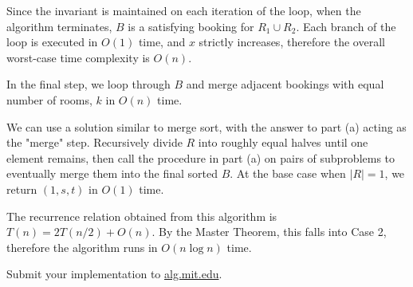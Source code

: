 \documentclass[12pt,twoside]{article}
\begin{document}
\begin{problems}
\begin{problemparts}
Since the invariant is maintained on each iteration of the loop, when the algorithm terminates, \(B\) is a satisfying booking for \(R_1 \cup R_2\). Each branch of the loop is executed in \(O(1)\) time, and \(x\) strictly increases, therefore the overall worst-case time complexity is \(O(n)\).

In the final step, we loop through \(B\) and merge adjacent bookings with equal number of rooms, \(k\) in \(O(n)\) time.

\problempart %
We can use a solution similar to merge sort, with the answer to part (a) acting as the "merge" step. Recursively divide \(R\) into roughly equal halves until one element remains, then call the procedure in part (a) on pairs of subproblems to eventually merge them into the final sorted \(B\). At the base case when \(|R|=1\), we return \((1, s, t)\) in \(O(1)\) time. 

The recurrence relation obtained from this algorithm is \(T(n)=2T(n/2)+O(n)\). By the Master Theorem, this falls into Case 2, therefore the algorithm runs in \(O(n \log n)\) time.

\problempart Submit your implementation to {\small\url{alg.mit.edu}}.
\end{problemparts}

\end{problems}
\end{document}
